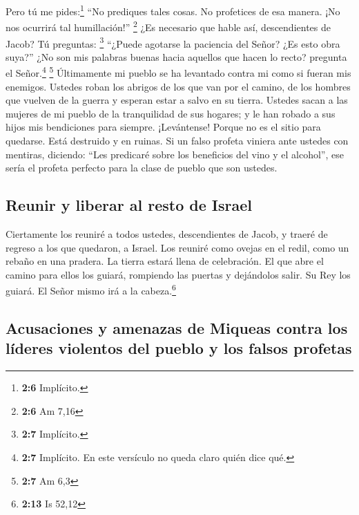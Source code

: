  Pero tú me pides:\footnote{\textbf{2:6} Implícito.} ``No
prediques tales cosas. No profetices de esa manera. ¡No nos ocurrirá tal
humillación!'' \footnote{\textbf{2:6} Am 7,16}  ¿Es
necesario que hable así, descendientes de Jacob? Tú preguntas:
\footnote{\textbf{2:7} Implícito.} ``¿Puede agotarse la paciencia del
Señor? ¿Es esto obra suya?'' ¿No son mis palabras buenas hacia aquellos
que hacen lo recto? pregunta el Señor.\footnote{\textbf{2:7} Implícito.
  En este versículo no queda claro quién dice qué.} \footnote{\textbf{2:7}
  Am 6,3}  Últimamente mi pueblo se ha levantado contra mi
como si fueran mis enemigos. Ustedes roban los abrigos de los que van
por el camino, de los hombres que vuelven de la guerra y esperan estar a
salvo en su tierra.  Ustedes sacan a las mujeres de mi
pueblo de la tranquilidad de sus hogares; y le han robado a sus hijos
mis bendiciones para siempre.  ¡Levántense! Porque no es
el sitio para quedarse. Está destruido y en ruinas.  Si
un falso profeta viniera ante ustedes con mentiras, diciendo: ``Les
predicaré sobre los beneficios del vino y el alcohol'', ese sería el
profeta perfecto para la clase de pueblo que son ustedes.

\hypertarget{reunir-y-liberar-al-resto-de-israel}{%
\subsection{Reunir y liberar al resto de
Israel}\label{reunir-y-liberar-al-resto-de-israel}}

 Ciertamente los reuniré a todos ustedes, descendientes
de Jacob, y traeré de regreso a los que quedaron, a Israel. Los reuniré
como ovejas en el redil, como un rebaño en una pradera. La tierra estará
llena de celebración.  El que abre el camino para ellos
los guiará, rompiendo las puertas y dejándolos salir. Su Rey los guiará.
El Señor mismo irá a la cabeza.\footnote{\textbf{2:13} Is 52,12}

\hypertarget{acusaciones-y-amenazas-de-miqueas-contra-los-luxedderes-violentos-del-pueblo-y-los-falsos-profetas}{%
\subsection{Acusaciones y amenazas de Miqueas contra los líderes
violentos del pueblo y los falsos
profetas}\label{acusaciones-y-amenazas-de-miqueas-contra-los-luxedderes-violentos-del-pueblo-y-los-falsos-profetas}}

